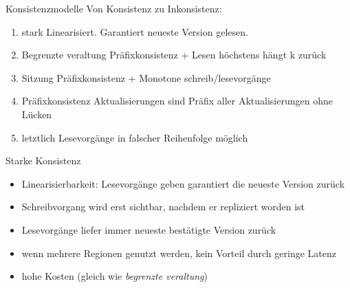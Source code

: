 \begin{flashcard}[Definition]{Konsistenzmodelle}
    Von Konsistenz zu Inkonsistenz:
    \begin{enumerate}
        \item stark\newline
            Linearisiert. Garantiert neueste Version gelesen.
        \item Begrenzte veraltung\newline
            Präfixkonsistenz + Lesen höchstens hängt k zurück
        \item Sitzung\newline
            Präfixkonsistenz + Monotone schreib/lesevorgänge
        \item Präfixkonsistenz\newline
            Aktualisierungen sind Präfix aller Aktualisierungen ohne Lücken
        \item letztlich\newline
            Lesevorgänge in falscher Reihenfolge möglich
    \end{enumerate}
\end{flashcard}

\begin{flashcard}[Definition]{Starke Konsistenz}
    \begin{itemize}
        \item Linearisierbarkeit:\newline
            Lesevorgänge geben garantiert die neueste Version zurück
        \item Schreibvorgang wird erst sichtbar, nachdem er repliziert worden ist
        \item Lesevorgänge liefer immer neueste bestätigte Version zurück
        \item wenn mehrere Regionen genutzt werden, kein Vorteil durch geringe Latenz
        \item hohe Kosten (gleich wie \emph{begrenzte veraltung})
    \end{itemize}
\end{flashcard}

